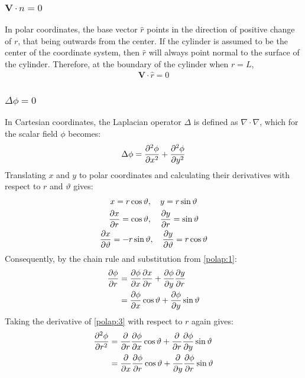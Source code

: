 \documentclass[a4paper,12pt]{article}
\newcommand{\rhat}{\hat{r}}
\newcommand{\nhat}{\hat{n}}
\renewcommand{\theta}{\vartheta}      		%
\newcommand{\partialder}[2]{\frac{\partial #1}{\partial #2}}        %
\begin{document}
\subsubsection{$\mathbf{V}\cdot\nhat=0$}
In polar coordinates, the base vector $\rhat$ points in the direction of positive change of $r$, that being outwards from the center. If the cylinder is assumed to be the center of the coordinate system, then $\rhat$ will always point normal to the surface of the cylinder. Therefore, at the boundary of the cylinder when $r=L$,
$$\begin{matrix}
	\mathbf{V}\cdot\rhat=0
\end{matrix}$$

\subsubsection{$\Delta\phi=0$}
In Cartesian coordinates, the Laplacian operator $\Delta$ is defined as $\nabla\cdot\nabla$, which for the scalar field $\phi$ becomes:
\begin{gather}
	\notag\Delta\phi=\frac{\partial^2\phi}{\partial x^2}+\frac{\partial^2\phi}{\partial y^2}
\end{gather}
Translating $x$ and $y$ to polar coordinates and calculating their derivatives with respect to $r$ and $\theta$ gives:
\begin{gather}
	\notag x=r\cos\theta,\quad y=r\sin\theta\\
	\label{polap:1}\partialder{x}{r}=\cos\theta,\quad\partialder{y}{r}=\sin\theta\\
	\label{polap:2}\partialder{x}{\theta}=-r\sin\theta,\quad\partialder{y}{\theta}=r\cos\theta
\end{gather}
Consequently, by the chain rule and substitution from \ref{polap:1}:
\begin{align}
	\notag\partialder{\phi}{r}&=\partialder{\phi}{x}\partialder{x}{r}+\partialder{\phi}{y}\partialder{y}{r}\\
	\label{polap:3}&=\partialder{\phi}{x}\cos\theta+\partialder{\phi}{y}\sin\theta
\end{align}
Taking the derivative of \ref{polap:3} with respect to $r$ again gives:
\begin{align}
	\notag\frac{\partial^2\phi}{\partial r^2}&=\partialder{}{r}\partialder{\phi}{x}\cos\theta+\partialder{}{r}\partialder{\phi}{y}\sin\theta\\
	\label{polap:4}&=\partialder{}{x}\partialder{\phi}{r}\cos\theta+\partialder{}{y}\partialder{\phi}{r}\sin\theta
\end{align}
\end{document}
